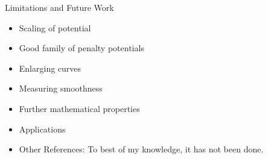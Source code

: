 \documentclass[aspectratio=169,fleqn]{beamer}
\begin{document}
  \begin{frame}{Limitations and Future Work}
    \pause
    \begin{itemize}
      \item<+-> Scaling of potential
      \item<+-> Good family of penalty potentials
      \item<+-> Enlarging curves
      \item<+-> Measuring smoothness
      \item<+-> Further mathematical properties
      \item<+-> Applications
      \item<+-> Other References: To best of my knowledge, it has not been done.
    \end{itemize}
  \end{frame}

\setcounter{backupcounter}{\value{framenumber}}

\setcounter{framenumber}{\value{backupcounter}}
\end{document}
